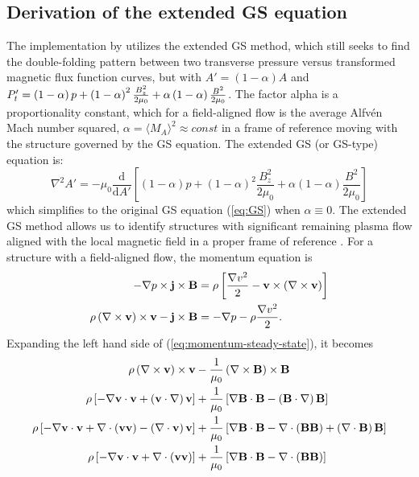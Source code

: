 \subsection{Derivation of the extended GS equation}
The implementation by \cite{Chen:2021} utilizes the extended GS method, which still seeks to find the double-folding pattern between two \gls{transverse pressure} versus \gls{transformed magnetic flux function} curves, but with $A'=(1-\alpha)A$ and $P_t'=\left( 1-\alpha \right)p + \left( 1-\alpha \right)^2\frac{B_z^2}{2\mu_0} + \alpha\left( 1-\alpha \right)\frac{B^2}{2\mu_0}$.  The factor \gls{alpha} is a proportionality constant, which for a field-aligned flow is the average Alfv\'en Mach number squared, $\alpha=\langle M_A\rangle^2 \approx const$ in a frame of reference moving with the structure governed by the GS equation. The extended GS (or GS-type) equation \citep{Teh:2018, Sonnerup:2006} is:
\begin{equation}
    \nabla^2 A' = -\mu_0\frac{\mathrm{d}}{\mathrm{d}A'}\left[\left(1-\alpha\right)p + \left(1-\alpha\right)^2\frac{B_z^2}{2\mu_0} + \alpha\left(1-\alpha\right)\frac{B^2}{2\mu_0} \right]
    \label{eq:GSextended}
\end{equation}
which simplifies to the original GS equation (\ref{eq:GS}) when $\alpha\equiv 0$. The extended GS method allows us to identify structures with significant remaining plasma flow aligned with the local magnetic field in a proper frame of reference \citep{Chen:2022}. For a structure with a field-aligned flow, the momentum equation is
\begin{equation}
    \begin{split}
        -\nabla p \times \mathbf{j}\times\mathbf{B} &= \rho\left[ \frac{\nabla v^2}{2} - \mathbf{v}\times\left( \nabla \times\mathbf{v} \right) \right] \\
        \rho\left( \nabla \times\mathbf{v} \right)\times\mathbf{v} - \mathbf{j}\times\mathbf{B} &= -\nabla p -\rho\frac{\nabla v^2}{2}. \\
    \end{split}
    \label{eq:momentum-steady-state}
\end{equation}
Expanding the left hand side of (\ref{eq:momentum-steady-state}), it becomes
\[\begin{split}
    \rho\left( \nabla \times\mathbf{v} \right)\times\mathbf{v} &- \frac{1}{\mu_0}\left( \nabla \times\mathbf{B} \right)\times\mathbf{B} \\
    \rho \left[ -\nabla\mathbf{v}\cdot\mathbf{v} + \left( \mathbf{v}\cdot\nabla \right)\mathbf{v} \right] &+ \frac{1}{\mu_0}\left[ \nabla\mathbf{B}\cdot\mathbf{B} - \left( \mathbf{B}\cdot\nabla \right)\mathbf{B} \right] \\
    \rho \left[ -\nabla\mathbf{v}\cdot\mathbf{v} + \nabla \cdot\left( \mathbf{v}\mathbf{v} \right) -\left( \nabla \cdot\mathbf{v} \right)\mathbf{v} \right] &+ \frac{1}{\mu_0}\left[ \nabla\mathbf{B}\cdot\mathbf{B} - \nabla \cdot\left( \mathbf{B}\mathbf{B} \right) + \left( \nabla \cdot\mathbf{B} \right) \mathbf{B} \right] \\
    \rho \left[ -\nabla\mathbf{v}\cdot\mathbf{v} + \nabla \cdot\left( \mathbf{v}\mathbf{v} \right) \right] &+ \frac{1}{\mu_0}\left[ \nabla\mathbf{B}\cdot\mathbf{B} - \nabla \cdot\left( \mathbf{B}\mathbf{B} \right) \right] \\
\end{split}\]
